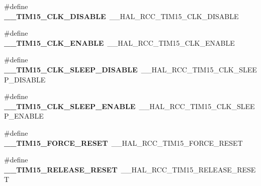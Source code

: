 \begin{DoxyCompactItemize}
\item 
\#define {\bfseries \+\_\+\+\_\+\+T\+I\+M15\+\_\+\+C\+L\+K\+\_\+\+D\+I\+S\+A\+B\+LE}~\+\_\+\+\_\+\+H\+A\+L\+\_\+\+R\+C\+C\+\_\+\+T\+I\+M15\+\_\+\+C\+L\+K\+\_\+\+D\+I\+S\+A\+B\+LE\hypertarget{group___h_a_l___r_c_c___aliased_gaf520deb7e38c475a833720a8c449bfcd}{}\label{group___h_a_l___r_c_c___aliased_gaf520deb7e38c475a833720a8c449bfcd}

\item 
\#define {\bfseries \+\_\+\+\_\+\+T\+I\+M15\+\_\+\+C\+L\+K\+\_\+\+E\+N\+A\+B\+LE}~\+\_\+\+\_\+\+H\+A\+L\+\_\+\+R\+C\+C\+\_\+\+T\+I\+M15\+\_\+\+C\+L\+K\+\_\+\+E\+N\+A\+B\+LE\hypertarget{group___h_a_l___r_c_c___aliased_ga26324fde431019435e70c6f9546a9116}{}\label{group___h_a_l___r_c_c___aliased_ga26324fde431019435e70c6f9546a9116}

\item 
\#define {\bfseries \+\_\+\+\_\+\+T\+I\+M15\+\_\+\+C\+L\+K\+\_\+\+S\+L\+E\+E\+P\+\_\+\+D\+I\+S\+A\+B\+LE}~\+\_\+\+\_\+\+H\+A\+L\+\_\+\+R\+C\+C\+\_\+\+T\+I\+M15\+\_\+\+C\+L\+K\+\_\+\+S\+L\+E\+E\+P\+\_\+\+D\+I\+S\+A\+B\+LE\hypertarget{group___h_a_l___r_c_c___aliased_ga2edf101c47e6e927889d454f7c3e4c08}{}\label{group___h_a_l___r_c_c___aliased_ga2edf101c47e6e927889d454f7c3e4c08}

\item 
\#define {\bfseries \+\_\+\+\_\+\+T\+I\+M15\+\_\+\+C\+L\+K\+\_\+\+S\+L\+E\+E\+P\+\_\+\+E\+N\+A\+B\+LE}~\+\_\+\+\_\+\+H\+A\+L\+\_\+\+R\+C\+C\+\_\+\+T\+I\+M15\+\_\+\+C\+L\+K\+\_\+\+S\+L\+E\+E\+P\+\_\+\+E\+N\+A\+B\+LE\hypertarget{group___h_a_l___r_c_c___aliased_ga9d37421bcf87efc7643928dfafabecf3}{}\label{group___h_a_l___r_c_c___aliased_ga9d37421bcf87efc7643928dfafabecf3}

\item 
\#define {\bfseries \+\_\+\+\_\+\+T\+I\+M15\+\_\+\+F\+O\+R\+C\+E\+\_\+\+R\+E\+S\+ET}~\+\_\+\+\_\+\+H\+A\+L\+\_\+\+R\+C\+C\+\_\+\+T\+I\+M15\+\_\+\+F\+O\+R\+C\+E\+\_\+\+R\+E\+S\+ET\hypertarget{group___h_a_l___r_c_c___aliased_ga03c43f6aa09a714c4d091331110a209a}{}\label{group___h_a_l___r_c_c___aliased_ga03c43f6aa09a714c4d091331110a209a}

\item 
\#define {\bfseries \+\_\+\+\_\+\+T\+I\+M15\+\_\+\+R\+E\+L\+E\+A\+S\+E\+\_\+\+R\+E\+S\+ET}~\+\_\+\+\_\+\+H\+A\+L\+\_\+\+R\+C\+C\+\_\+\+T\+I\+M15\+\_\+\+R\+E\+L\+E\+A\+S\+E\+\_\+\+R\+E\+S\+ET\hypertarget{group___h_a_l___r_c_c___aliased_ga1b9c6bc76d9ee78a55710eb7773a2bbc}{}\label{group___h_a_l___r_c_c___aliased_ga1b9c6bc76d9ee78a55710eb7773a2bbc}


\end{DoxyCompactItemize}

